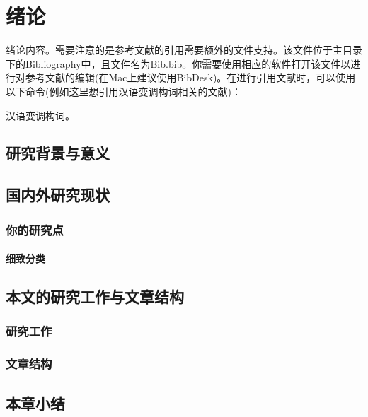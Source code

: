 \documentclass[../main.tex]{subfiles}
\begin{document}
\chapter{绪论}

绪论内容。需要注意的是参考文献的引用需要额外的文件支持。该文件位于主目录下的Bibliography中，且文件名为Bib.bib。你需要使用相应的软件打开该文件以进行对参考文献的编辑(在Mac上建议使用BibDesk)。在进行引用文献时，可以使用以下命令(例如这里想引用汉语变调构词相关的文献)：

汉语变调构词\cite{syw}。

\section{研究背景与意义}

\section{国内外研究现状}

\subsection{你的研究点}

\subsubsection{细致分类}

\section{本文的研究工作与文章结构}

\subsection{研究工作}

\subsection{文章结构}

\section{本章小结}
\end{document}
